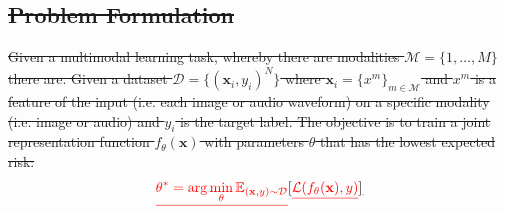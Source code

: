 \documentclass[fleqn,10pt]{wlscirep}
\providecommand{\DIFdel}[1]{{\protect\color{red}\sout{#1}}} %
\begin{document}
\subsection{\DIFdel{Problem Formulation}}
\addtocounter{subsection}{-1}%
\DIFdel{Given a multimodal learning task, whereby there are modalities $\mathcal{M} = \{1, \dots, M\}$ there are. Given a dataset $\mathcal{D} = \{(\mathbf{x}_i, y_i)^N\}$ where $\mathbf{x}_i = \{x^m\}_{m \in \mathcal{M}}$ and $x^m$ is a feature of the input (i.e. each image or audio waveform) on a specific modality (i.e. image or audio) and $y_i$ is the target label. The objective is to train a joint representation function $f_\theta(\mathbf{x})$ with parameters $\theta$ that has the lowest expected risk: }\begin{displaymath}
    \DIFdel{\theta^* = \arg\min_\theta \mathbb{E}_{(\mathbf{x}, y) \sim \mathcal{D}} }[\DIFdel{\mathcal{L}(f_\theta(\mathbf{x}), y)}]
\DIFdel{}\end{displaymath}%
\end{document}
